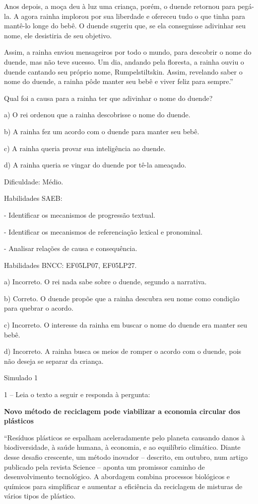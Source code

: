 Anos depois, a moça deu à luz uma criança, porém, o duende retornou para
pegá-la. A agora rainha implorou por sua liberdade e ofereceu tudo o que
tinha para mantê-lo longe do bebê. O duende sugeriu que, se ela
conseguisse adivinhar seu nome, ele desistiria de seu objetivo.

Assim, a rainha enviou mensageiros por todo o mundo, para descobrir o
nome do duende, mas não teve sucesso. Um dia, andando pela floresta, a
rainha ouviu o duende cantando seu próprio nome, Rumpelstiltskin. Assim,
revelando saber o nome do duende, a rainha pôde manter seu bebê e viver
feliz para sempre.''

Qual foi a causa para a rainha ter que adivinhar o nome do duende?

a) O rei ordenou que a rainha descobrisse o nome do duende.

b) A rainha fez um acordo com o duende para manter seu bebê.

c) A rainha queria provar sua inteligência ao duende.

d) A rainha queria se vingar do duende por tê-la ameaçado.

Dificuldade: Médio.

Habilidades SAEB:

- Identificar os mecanismos de progressão textual.

- Identificar os mecanismos de referenciação lexical e pronominal.

- Analisar relações de causa e consequência.

Habilidades BNCC: EF05LP07, EF05LP27.

a) Incorreto. O rei nada sabe sobre o duende, segundo a narrativa.

b) Correto. O duende propõe que a rainha descubra seu nome como condição
para quebrar o acordo.

c) Incorreto. O interesse da rainha em buscar o nome do duende era
manter seu bebê.

d) Incorreto. A rainha busca os meios de romper o acordo com o duende,
pois não deseja se separar da criança.

Simulado 1

1 -- Leia o texto a seguir e responda à pergunta:

\textbf{Novo método de reciclagem pode viabilizar a economia circular
dos plásticos}

``Resíduos plásticos se espalham aceleradamente pelo planeta causando
danos à biodiversidade, à saúde humana, à economia, e ao equilíbrio
climático. Diante desse desafio crescente, um método inovador --
descrito, em outubro, num artigo publicado pela revista Science --
aponta um promissor caminho de desenvolvimento tecnológico. A abordagem
combina processos biológicos e químicos para simplificar e aumentar a
eficiência da reciclagem de misturas de vários tipos de plástico.

